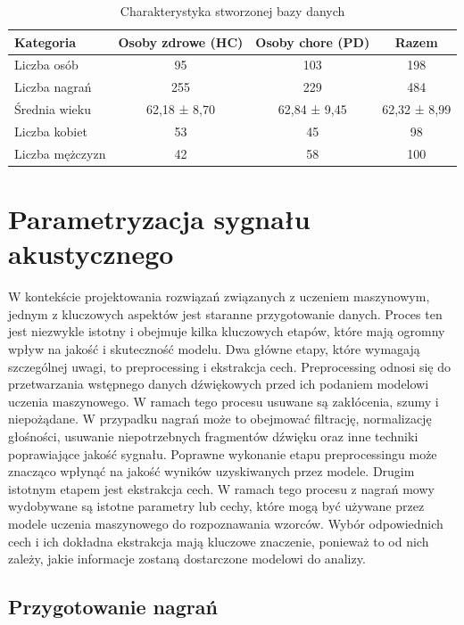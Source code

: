\begin{table}[h]
\centering
\caption{Charakterystyka stworzonej bazy danych}
\label{tab:summary-database}
\begin{tabular}{|l|c|c|c|}
\hline
\textbf{Kategoria} &\textbf{Osoby zdrowe (HC)} &\textbf{Osoby chore (PD)} &\textbf{Razem} \\ \hline
Liczba osób &95 &103 &198\\ \hline
Liczba nagrań &255 &229 &484\\ \hline
Średnia wieku & 62,18 ± 8,70 & 62,84 ± 9,45  & 62,32 ± 8,99 \\ \hline
Liczba kobiet &53 &45 &98\\ \hline
Liczba mężczyzn &42 &58 &100 \\ \hline
\end{tabular}
\end{table}

\section{Parametryzacja sygnału akustycznego}
\label{sec:parametryzacja-sygnalu-akustycznego}

W kontekście projektowania rozwiązań związanych z uczeniem maszynowym, jednym z kluczowych aspektów jest staranne przygotowanie danych.
Proces ten jest niezwykle istotny i obejmuje kilka kluczowych etapów, które mają ogromny wpływ na jakość i skuteczność modelu.
Dwa główne etapy, które wymagają szczególnej uwagi, to preprocessing i ekstrakcja cech.
Preprocessing odnosi się do przetwarzania wstępnego danych dźwiękowych przed ich podaniem modelowi uczenia maszynowego.
W ramach tego procesu usuwane są zakłócenia, szumy i niepożądane.
W przypadku nagrań może to obejmować filtrację, normalizację głośności, usuwanie niepotrzebnych fragmentów dźwięku oraz inne techniki poprawiające jakość sygnału.
Poprawne wykonanie etapu preprocessingu może znacząco wpłynąć na  jakość wyników uzyskiwanych przez modele.
Drugim istotnym etapem jest ekstrakcja cech.
W ramach tego procesu z nagrań mowy wydobywane są istotne parametry lub cechy, które mogą być używane przez modele uczenia maszynowego do rozpoznawania wzorców.
Wybór odpowiednich cech i ich dokładna ekstrakcja mają kluczowe znaczenie, ponieważ to od nich zależy, jakie informacje zostaną dostarczone modelowi do analizy.

\subsection{Przygotowanie nagrań}
\label{subsec:preprocessing}

